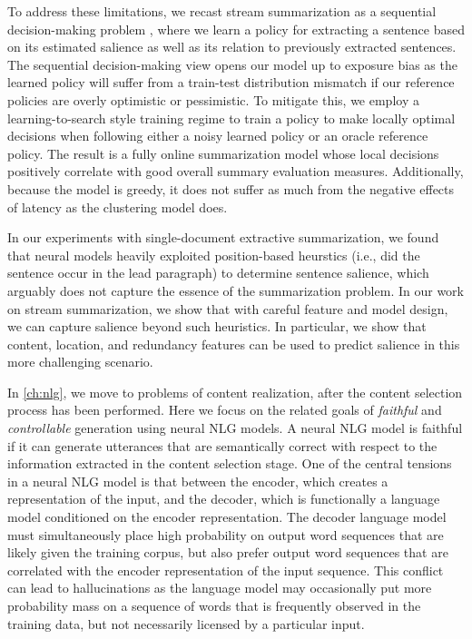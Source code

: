 To address these limitations, we recast stream summarization as a sequential
decision-making problem \citep{littman1996}, where we learn a policy for
extracting a sentence based on its estimated salience as well as its relation
to previously extracted sentences.  The sequential decision-making view opens
our model up to exposure bias as the learned policy will suffer from a
train-test distribution mismatch if our reference policies are overly
optimistic or pessimistic.  To mitigate this, we employ a learning-to-search
style training regime \citep{chang2015} to train a policy to make locally
optimal decisions when following either a noisy learned policy or an oracle
reference policy.  The result is a fully online summarization model whose
local decisions positively correlate with good overall summary evaluation
measures.  Additionally, because the model is greedy, it does not suffer as
much from the negative effects of latency as the clustering model does.
      
In our experiments with single-document extractive summarization, we found
that neural models heavily exploited position-based heurstics (i.e., did the
sentence occur in the lead paragraph) to determine sentence salience, which
arguably does not capture the essence of the summarization problem. In our
work on stream summarization, we show that with careful feature and model
design, we can capture salience beyond such heuristics.  In particular, we
show that content, location, and redundancy features can be used to predict
salience in this more challenging scenario.

In \autoref{ch:nlg}, we move to problems of content realization, after the
content selection process has been performed.  Here we focus on the related
goals of \textit{faithful} and \textit{controllable} generation using neural
NLG models. A neural NLG model is faithful if it can generate utterances that
are semantically correct with respect to the information extracted in the
content selection stage.  One of the central tensions in a neural NLG model is
that between the encoder, which creates a representation of the input, and the
decoder, which is functionally a language model conditioned on the encoder
representation.  The decoder language model must simultaneously place high
probability on output word sequences that are likely given the training
corpus, but also prefer output word sequences that are correlated with the
encoder representation of the input sequence. This conflict can lead to
hallucinations as the language model may occasionally put more probability
mass on a sequence of words that is frequently observed in the training data,
but not necessarily licensed by a particular input.

